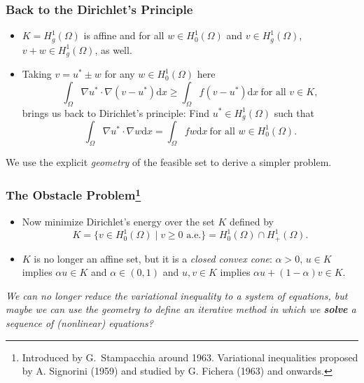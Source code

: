 \documentclass[aspectratio=169,xcolor=dvipsnames,11pt]{beamer}
\newcommand{\dd}{\mathrm{d}}
\newcommand{\fa}{\text{for all }}
\begin{document}
\begin{frame}\frametitle{Back to the Dirichlet's Principle}
\begin{itemize}
\item $K = H^1_g(\Omega)$ is affine and for all $w \in H^1_0(\Omega)$ and $v \in H^1_g(\Omega)$, $v + w \in H^1_g(\Omega)$, as well. \pause
\item Taking $v = u^\ast\pm w$ for any $w \in H^1_0(\Omega)$ here
\begin{equation*}
	\int_\Omega \nabla u^\ast \cdot \nabla (v-u^*)  \dd x \geq \int_\Omega f (v - u^*) \dd x
	~\fa v \in K,
\end{equation*}
brings us back to Dirichlet's principle: Find $u^* \in H^1_g(\Omega)$ such that
\begin{equation*}
	\int_\Omega \nabla u^\ast \cdot \nabla w \dd x = \int_\Omega f w \dd x
	~\fa w \in H^1_0(\Omega).
\end{equation*}
\end{itemize}\pause
\begin{center}
 We use the explicit \textit{geometry} of the feasible set to derive a simpler problem.
 \end{center}
\end{frame}

\begin{frame}\frametitle{The Obstacle Problem\footnote{\tiny Introduced by G.\ Stampacchia around 1963. Variational inequalities proposed by A. Signorini (1959) and studied by G. Fichera (1963) and onwards.}}
\begin{itemize}
\item Now minimize Dirichlet's energy over the set $K$ defined by  
\[
K = \{ v \in H^1_0(\Omega) \mid v \geq 0 \text{~a.e.}\} = H^1_0(\Omega) \cap H^1_+(\Omega).
\] 
\item $K$ is no longer an affine set, but it is a \textit{closed convex cone}: \pause $\alpha > 0$, $u \in K$ implies $\alpha u \in K$ \pause and $\alpha \in (0,1)$ and $u, v \in K$ implies $\alpha u + (1-\alpha) v \in K$.
\end{itemize}\pause
\begin{center}\textit{
We can no longer reduce the variational inequality to a system of equations, \pause but maybe we can use the geometry to define an iterative method in which we \textbf{solve} a sequence of (nonlinear) equations?
}
\end{center}
\end{frame}
\end{document}
